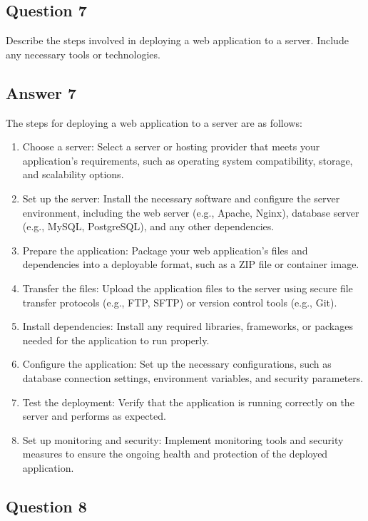 \documentclass{article}
\begin{document}
\subsection*{Question 7}

Describe the steps involved in deploying a web application to a server. Include any necessary tools or technologies.

\subsection*{Answer 7}
The steps for deploying a web application to a server are as follows:
\begin{enumerate}
  \item Choose a server: Select a server or hosting provider that meets your application's requirements, such as operating system compatibility, storage, and scalability options.
  \item Set up the server: Install the necessary software and configure the server environment, including the web server (e.g., Apache, Nginx), database server (e.g., MySQL, PostgreSQL), and any other dependencies.
  \item Prepare the application: Package your web application's files and dependencies into a deployable format, such as a ZIP file or container image.
  \item Transfer the files: Upload the application files to the server using secure file transfer protocols (e.g., FTP, SFTP) or version control tools (e.g., Git).
  \item Install dependencies: Install any required libraries, frameworks, or packages needed for the application to run properly.
  \item Configure the application: Set up the necessary configurations, such as database connection settings, environment variables, and security parameters.
  \item Test the deployment: Verify that the application is running correctly on the server and performs as expected.
  \item Set up monitoring and security: Implement monitoring tools and security measures to ensure the ongoing health and protection of the deployed application.
\end{enumerate}

\subsection*{Question 8}
\end{document}
